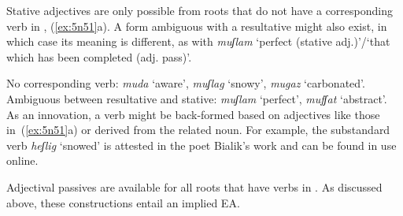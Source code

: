\begin{exe}
\begin{xlist}
\begin{exe}
\begin{xlist}
\begin{exe}
\begin{exe}
\begin{xlist}
\begin{exe}
\begin{exe}
\begin{xlist}
\begin{exe}
\begin{xlist}
\begin{exe}
\begin{xlist}
\begin{exe}
\begin{xlist}
\begin{xlist}
\begin{exe}
\begin{xlist}
\begin{exe}
\begin{xlist}
\begin{exe}
\begin{exe}
\begin{exe}
\begin{xlist}
\begin{exe}
\begin{exe}
\begin{xlist}
\begin{exe}
\begin{xlist}
\begin{exe}
\begin{xlist}
\begin{exe}
\begin{xlist}
\begin{xlist}
\begin{exe}
\begin{xlist}
\begin{exe}
\begin{xlist}
\begin{exe}
\begin{xlist}
\begin{exe}
\begin{xlist}
\begin{exe}
\begin{exe}
\begin{exe}
\begin{exe}
\begin{exe}
\begin{xlist}
\begin{xlist}
\begin{exe}
\begin{xlist}
\begin{exe}
\begin{xlist}
\begin{exe}
\begin{exe}
\begin{exe}
\begin{xlist}
\begin{exe}
\begin{xlist}
Stative adjectives are only possible from roots that do not have a corresponding verb in \thif, (\ref{ex:5n51}a). A form ambiguous with a resultative might also exist, in which case its meaning is different, as with \emph{muʃlam} `perfect (stative adj.)'/`that which has been completed (adj. pass)'.
 \begin{exe}
 \ex  \label{ex:5n51}
 \begin{xlist} 
   \ex  No corresponding verb: \emph{muda} `aware', \emph{muʃlag} `snowy', \emph{mugaz} `carbonated'. 
   \ex  Ambiguous between resultative and stative: \emph{muʃlam} `perfect', \emph{mufʃat} `abstract'. 
 \z
\z 
As an innovation, a verb might be back-formed based on adjectives like those in~(\ref{ex:5n51}a) or derived from the related noun. For example, the substandard verb \emph{heʃlig} `snowed' is attested in the poet Bialik's work and can be found in use online.

Adjectival passives are available for all roots that have verbs in \thif. As discussed above, these constructions entail an implied EA.


\end{xlist}
\end{exe}
\end{xlist}
\end{exe}
\end{xlist}
\end{exe}
\end{exe}
\end{exe}
\end{xlist}
\end{exe}
\end{xlist}
\end{exe}
\end{xlist}
\end{xlist}
\end{exe}
\end{exe}
\end{exe}
\end{exe}
\end{exe}
\end{xlist}
\end{exe}
\end{xlist}
\end{exe}
\end{xlist}
\end{exe}
\end{xlist}
\end{exe}
\end{xlist}
\end{xlist}
\end{exe}
\end{xlist}
\end{exe}
\end{xlist}
\end{exe}
\end{xlist}
\end{exe}
\end{exe}
\end{xlist}
\end{exe}
\end{exe}
\end{exe}
\end{xlist}
\end{exe}
\end{xlist}
\end{exe}
\end{xlist}
\end{xlist}
\end{exe}
\end{xlist}
\end{exe}
\end{xlist}
\end{exe}
\end{xlist}
\end{exe}
\end{exe}
\end{xlist}
\end{exe}
\end{exe}
\end{xlist}
\end{exe}
\end{xlist}
\end{exe}

